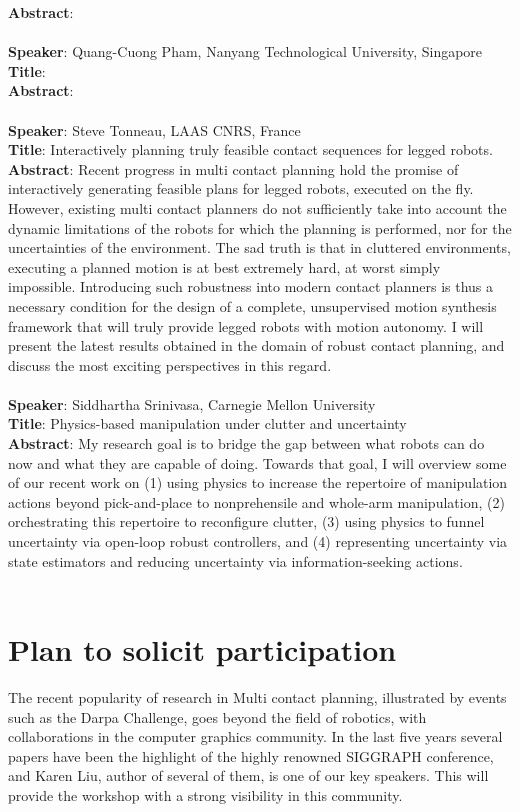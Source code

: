\documentclass[12pt]{article}
\begin{document}
\textbf{Abstract}:  \\ \\
\textbf{Speaker}: Quang-Cuong Pham, Nanyang Technological University, Singapore \\
\textbf{Title}:  \\
\textbf{Abstract}:  \\ \\
\textbf{Speaker}: Steve Tonneau, LAAS CNRS, France \\
\textbf{Title}: Interactively planning truly feasible contact sequences for legged robots.\\
\textbf{Abstract}: Recent progress in multi contact planning hold the promise of interactively generating feasible plans for legged robots, executed on the fly.
However, existing multi contact planners do not sufficiently take into account the dynamic limitations of the robots for which the planning is performed, nor for the uncertainties of the environment. The sad truth is that in cluttered environments, executing a planned motion is at best extremely hard, at worst simply impossible. Introducing such
robustness into modern contact planners is thus a necessary condition for the design of a complete, unsupervised
motion synthesis framework that will truly provide legged robots with motion autonomy. I will
present the latest results obtained in the domain of robust contact planning, and discuss the most exciting perspectives
in this regard.\\ \\
\textbf{Speaker}: Siddhartha Srinivasa, Carnegie Mellon University \\ 
\textbf{Title}: Physics-based manipulation under clutter and uncertainty \\
\textbf{Abstract}: My research goal is to bridge the gap between what robots can do now and what they are capable of doing. Towards that goal, I will overview some of our recent work on (1) using physics to increase the repertoire of manipulation actions beyond pick-and-place to nonprehensile and whole-arm manipulation, (2) orchestrating this repertoire to reconfigure clutter, (3) using physics to funnel uncertainty via open-loop robust controllers, and (4) representing uncertainty via state estimators and reducing uncertainty via information-seeking actions. \\ \\

\section{Plan to solicit participation}
The recent popularity of research in Multi contact planning, illustrated by events such as the Darpa Challenge, goes beyond the field of robotics, with collaborations in the computer graphics community. In the last five years several papers have been the highlight of the highly renowned SIGGRAPH conference, and Karen Liu, author of several of them, is one of our key speakers. This will provide the workshop with a strong visibility in this community.
\end{document}
